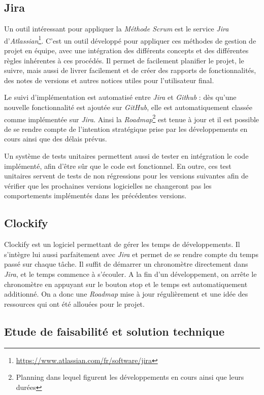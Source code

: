 		\subsection{Jira}

			Un outil intéressant pour appliquer la \textit{Méthode Scrum} est le service \textit{Jira} d'\textit{Atlassian}\footnote{\url{https://www.atlassian.com/fr/software/jira}}. C'est un outil développé pour appliquer ces méthodes de gestion de projet en équipe, avec une intégration des différents concepts et des différentes règles inhérentes à ces procédés. Il permet de facilement planifier le projet, le suivre, mais aussi de livrer facilement et de créer des rapports de fonctionnalités, des notes de versions et autres notices utiles pour l'utilisateur final.
		
			Le suivi d'implémentation est automatisé entre \textit{Jira} et \textit{Github} : dès qu'une nouvelle fonctionnalité est ajoutée sur \textit{GitHub}, elle est automatiquement classée comme implémentée sur \textit{Jira}. Ainsi la \textit{Roadmap}\footnote{Planning dans lequel figurent les développements en cours ainsi que leurs durées} est tenue à jour et il est possible de se rendre compte de l'intention stratégique prise par les développements en cours ainsi que des délais prévus.

			Un système de tests unitaires permettent aussi de tester en intégration le code implémenté, afin d'être sûr que le code est fonctionnel. En outre, ces test unitaires servent de tests de non régressions pour les versions suivantes afin de vérifier que les prochaines versions logicielles ne changeront pas les comportements implémentés dans les précédentes versions.

		\subsection{Clockify}
			
			Clockify est un logiciel permettant de gérer les temps de développements. Il s'intègre lui aussi parfaitement avec \textit{Jira} et permet de se rendre compte du temps passé sur chaque tâche. Il suffit de démarrer un chronomètre directement dans \textit{Jira}, et le temps commence à s'écouler. A la fin d'un développement, on arrête le chronomètre en appuyant sur le bouton stop et le temps est automatiquement additionné. On a donc une \textit{Roadmap} mise à jour régulièrement et une idée des ressources qui ont été allouées pour le projet.

		\subsection{Etude de faisabilité et solution technique}

